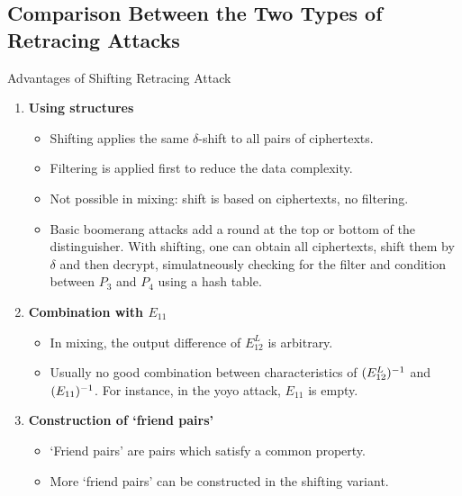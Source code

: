\documentclass[notheorems]{beamer}
\theoremstyle{definition}
\theoremstyle{example}
\begin{document}
    \subsection{Comparison Between the Two Types of Retracing Attacks}
    \label{subsec:cmp}
    \begin{frame}[<+->]{Advantages of Shifting Retracing Attack}
        \begin{enumerate}
            \item \textbf{Using structures}
            \begin{itemize}[<+->]
                \item Shifting applies the same \(\delta\)-shift to all pairs of
                ciphertexts.
                \item Filtering is applied first to reduce the data complexity.
                \item Not possible in mixing: shift is based on ciphertexts, no
                filtering.
                \item Basic boomerang attacks add a round at the top or bottom
                of the distinguisher. With shifting, one can obtain all
                ciphertexts, shift them by \(\delta\) and then decrypt,
                simulatneously checking for the filter and condition between
                \(P_3\) and \(P_4\) using a hash table.
            \end{itemize}
            \item \textbf{Combination with \(E_{11}\)}
            \begin{itemize}[<+->]
                \item In mixing, the output difference of \(E_{12}^L\) is
                arbitrary.
                \item Usually no good combination between characteristics of
                \((E_{12}^L)^{-1}\) and \((E_{11})^{-1}\). For
                instance, in the yoyo attack, \(E_{11}\) is empty.
            \end{itemize}
            \item \textbf{Construction of `friend pairs'}
            \begin{itemize}[<+->]
                \item `Friend pairs' are pairs which satisfy a common property.
                \item More `friend pairs' can be constructed in the shifting
                variant.
            \end{itemize}
        \end{enumerate}
    \end{frame}
\end{document}
